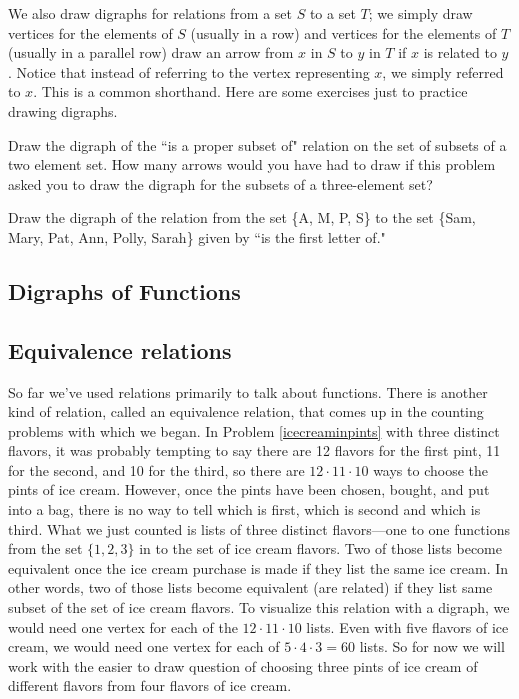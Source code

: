 We also draw digraphs for relations from a set $S$ to a  set
$T$; we simply draw vertices for the elements of $S$ (usually
in a row) and vertices for the elements of $T$ (usually in a
parallel row) draw an arrow from
$x$ in $S$ to $y$ in $T$ if $x$ is related to $y$.  Notice
that instead of referring to the vertex representing $x$, we
simply referred to $x$.  This is a common shorthand.  Here are
some exercises just to practice drawing digraphs.

\bp
\item Draw the digraph of the ``is a proper subset of" relation
on the set of subsets of a two element set.  How many arrows
would you have had to draw if this problem asked you to draw
the digraph for the subsets of a three-element set?

\item Draw the digraph of the relation from the set \{A, M, P,
S\} to the set \{Sam, Mary, Pat, Ann, Polly, Sarah\}  given by
``is the first letter of."
\solution{\begin{center}
\mbox{\psfig{figure=initialdigraph.eps%
}}
\end{center} }
\ep

\subsection{Digraphs of Functions}\label{digraphsoffunctions}
\subsection{Equivalence relations}\label{equivalencerelations} So
far we've used relations primarily to talk about functions. 
There is another kind of relation, called an equivalence
relation, that comes up in the counting problems with which we
began.
 In Problem
\ref{icecreaminpints} with three distinct flavors, it was
probably tempting to say there are 12 flavors for the first
pint, 11 for the second, and 10 for the third, so there are
$12\cdot 11\cdot 10$ ways to choose the pints of ice cream. 
However, once the pints have been chosen, bought, and put into a
bag, there is no way to tell which is first, which is second and
which is third.  What we just counted is lists of three
distinct flavors---one to one functions from the set
$\{1,2,3\}$ in to the set of ice cream flavors.  Two of those
lists become equivalent once the ice cream purchase is
made if they list the same ice cream.  In other words, two of
those lists become equivalent (are related) if they list same
subset of the set of ice cream flavors.  To visualize this
relation with a digraph, we would need one vertex for each of
the 
$12\cdot 11\cdot 10$ lists.  Even with
 five flavors of ice cream, we would need one vertex for each
of
$5\cdot4\cdot3=60$ lists.  So for now we will work with the easier
to draw question of choosing three pints of ice cream of different
flavors from four flavors of ice cream.


